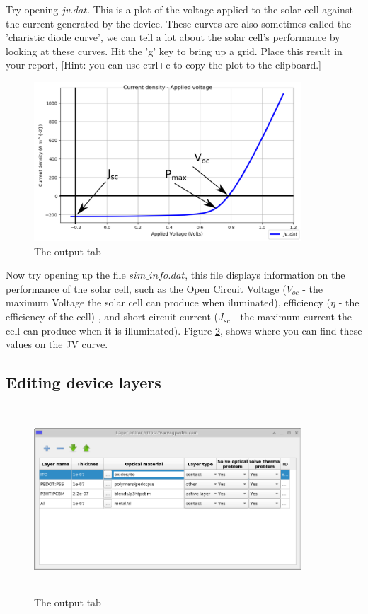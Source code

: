 Try opening $jv.dat$. This is a plot of the voltage applied to the solar cell against the current generated by the device.  These curves are also sometimes called the 'charistic diode curve', we can tell a lot about the solar cell's performance by looking at these curves.  Hit the 'g' key to bring up a grid.  Place this result in your report, [Hint: you can use ctrl+c to copy the plot to the clipboard.]

\begin{figure}[H]
\centering
\includegraphics[width=100mm]{./images/jv_curve.png}
\caption{The output tab}
\label{fig:jv_curve}
\end{figure}


Now try opening up the file $sim\_info.dat$, this file displays information on the performance of the solar cell, such as the Open Circuit Voltage ($V_{oc}$ - the maximum Voltage the solar cell can produce when iluminated), efficiency ($\eta$ - the efficiency of the cell) , and short circuit current ($J_{sc}$ - the maximum current the cell can produce when it is illuminated).  Figure \ref{fig:jv_curve}, shows where you can find these values on the JV curve.

\subsection{Editing device layers}

\begin{figure}[H]
\centering
\includegraphics[width=100mm,height=70mm]{./images/layer_editor.png}
\caption{The output tab}
\label{fig:jv_curve}
\end{figure}

